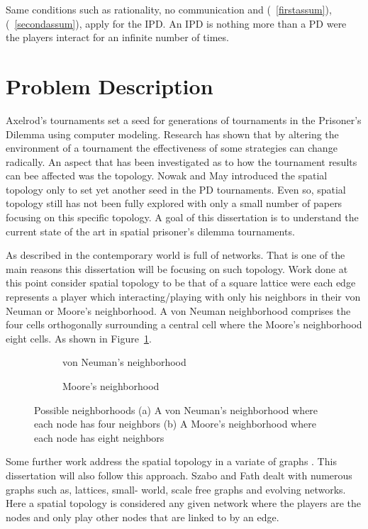 Same conditions such as rationality, no communication and (~\ref{firstassum}),
(~\ref{secondassum}),
apply for the IPD. An IPD is nothing more than a PD were
the players interact for an infinite number of times.

\section{Problem Description}
Axelrod's tournaments set a seed for generations of tournaments in the
Prisoner's Dilemma using computer modeling. Research has shown that by altering the
environment of a tournament the effectiveness of some strategies can change
radically. An aspect that has been investigated as to how the tournament results
can bee affected was the topology. Nowak and May \cite{Nowak1992} introduced the spatial topology
only to set yet another seed in the PD tournaments. Even so, spatial topology
still has not been fully explored with only a small number of papers focusing on
this specific topology.  A goal of this dissertation is to understand the
current state of the art in spatial prisoner’s dilemma tournaments.

As described in \cite{MacLane1971} the contemporary world is full of networks. That
is one of the main reasons this dissertation will be focusing on such topology.
Work done at this point consider spatial topology to be that of a square lattice
were each edge represents a player which interacting/playing with only his
neighbors in their von Neuman or Moore's neighborhood. A von Neuman neighborhood
comprises the four cells orthogonally surrounding a central cell where the
Moore's neighborhood eight cells. As shown in Figure~\ref{fig:neighborhood}.

\begin{figure}[!hbtp]
	\centering
	\begin{subfigure}[h]{0.45\textwidth}
		\centering
		
		\caption{von Neuman's neighborhood}
	\end{subfigure}
	\hfill
	\begin{subfigure}[h]{0.52\textwidth}\centering
		\centering
		
		\caption{Moore's neighborhood}
	\end{subfigure}
  \caption{Possible neighborhoods (a) A von Neuman's neighborhood where each node has four neighbors
  (b) A Moore's neighborhood where each node has eight neighbors}
  \label{fig:neighborhood}
\end{figure}

Some further work address the spatial topology in a variate of graphs
\cite{Dresher1992a, Szabo2007, Lutz2013, Meng2015}.
This dissertation will also follow this approach. Szabo and Fath dealt with
numerous graphs such as, lattices, small- world, scale free graphs and evolving
networks. Here a spatial topology is considered any given network where the
players are the nodes and only play other nodes that are linked to by
an edge.


